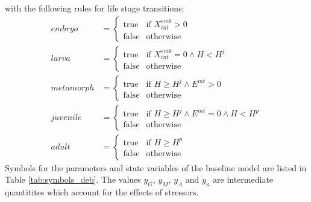 \documentclass[utf8]{FrontiersinHarvard} %
\begin{document}
%
with the following rules for life stage transitions: 
%
\begin{align}
    embryo &= 
    \begin{cases}
        \text{true} & \text{if } X^{emb}_{int} > 0 \\
        \text{false} & \text{otherwise}
    \end{cases} \\
    larva &= 
    \begin{cases}
        \text{true} & \text{if } X^{emb}_{int} = 0 \land H < H^j \\
        \text{false} & \text{otherwise}
    \end{cases}\\
    metamorph &= 
    \begin{cases}
        \text{true} & \text{if } H \geq H^j \land E^{mt}>0 \\ 
        \text{false} & \text{otherwise}
    \end{cases}\\
    juvenile &= 
    \begin{cases}
        \text{true} & \text{if } H \geq H^j \land E^{mt}=0 \land H < H^p \\ 
        \text{false} & \text{otherwise}
    \end{cases} \\
    adult &= 
    \begin{cases}
        \text{true} & \text{if } H \geq H^p \\ 
        \text{false} & \text{otherwise}
    \end{cases}
    \label{eq:lifestages_amphibians}
\end{align}%
%
Symbols for the parameters and state variables of the baseline model are listed in Table \ref{tab:symbols_deb}.
The values $y_G$, $y_M$, $y_A$ and $y_{\kappa}$ 
are intermediate quantitites which account for the effects of stressors.
\end{document}
